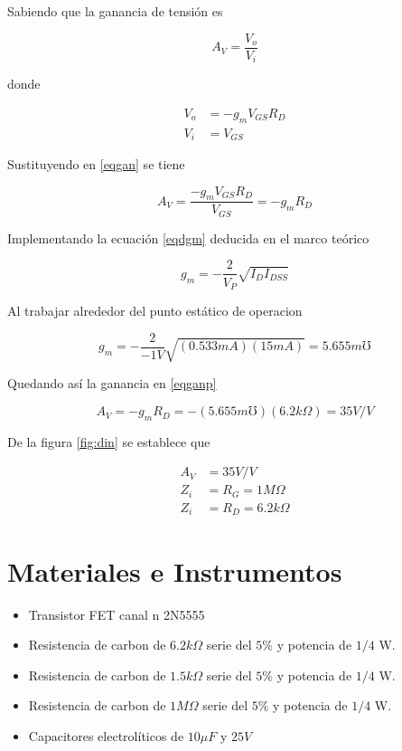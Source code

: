 \documentclass[12pt, a4paper]{article}
\begin{document}
    Sabiendo que la ganancia de tensión es

    \begin{equation} \label{eqgan}
        A_V = \frac{V_o}{V_i}
    \end{equation}

    donde

    \begin{equation*}
        \begin{split}
            V_o & = -g_mV_{GS}R_D \\
            V_i & = V_{GS}
        \end{split}
    \end{equation*}

    Sustituyendo en \eqref{eqgan} se tiene

    \begin{equation} \label{eqganp}
        A_V = \frac{-g_mV_{GS}R_D}{V_{GS}} = -g_mR_D
    \end{equation}

    Implementando la ecuación \eqref{eqdgm} deducida en el marco teórico

    $$g_m = -\frac{2}{V_P}\sqrt{I_DI_{DSS}}$$

    Al trabajar alrededor del punto estático de operacion

    $$g_m = -\frac{2}{-1V}\sqrt{(0.533mA)(15mA)} = 5.655 m\mho$$

    Quedando así la ganancia en \eqref{eqganp}

    $$A_V = -g_mR_D = -(5.655 m\mho)(6.2 k\Omega) = 35 V/V$$

    De la figura \ref{fig:din} se establece que

    \begin{equation*}
        \begin{split}
            A_V & = 35 V/V \\
            Z_i & = R_G = 1M\Omega \\
            Z_i & = R_D = 6.2k\Omega
        \end{split}
    \end{equation*}

    \newpage

    \section{Materiales e Instrumentos}


    \begin{itemize}
        \item Transistor FET canal n 2N5555
        \item Resistencia de carbon de $6.2k\Omega$  serie del $5\%$ y potencia de $1/4$ W.
        \item Resistencia de carbon de $1.5k\Omega$  serie del $5\%$ y potencia de $1/4$ W.
        \item Resistencia de carbon de $1M\Omega$  serie del $5\%$ y potencia de $1/4$ W.
        \item Capacitores electrolíticos de $10\mu F$ y $25V$
    \end{itemize}
\end{document}

